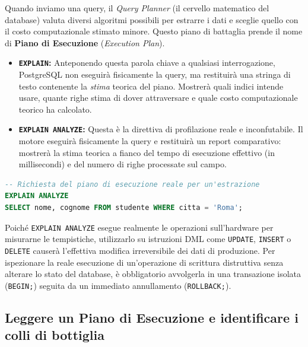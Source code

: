 Quando inviamo una query, il \textit{Query Planner} (il cervello matematico del database) valuta diversi algoritmi possibili per estrarre i dati e sceglie quello con il costo computazionale stimato minore. Questo piano di battaglia prende il nome di \textbf{Piano di Esecuzione} (\textit{Execution Plan}).

\begin{itemize}
    \item \textbf{\texttt{EXPLAIN}:} Anteponendo questa parola chiave a qualsiasi interrogazione, PostgreSQL non eseguirà fisicamente la query, ma restituirà una stringa di testo contenente la \textit{stima} teorica del piano. Mostrerà quali indici intende usare, quante righe stima di dover attraversare e quale costo computazionale teorico ha calcolato.
    \item \textbf{\texttt{EXPLAIN ANALYZE}:} Questa è la direttiva di profilazione reale e inconfutabile. Il motore eseguirà fisicamente la query e restituirà un report comparativo: mostrerà la stima teorica a fianco del tempo di esecuzione effettivo (in millisecondi) e del numero di righe processate sul campo.
\end{itemize}

\begin{lstlisting}[language=SQL, basicstyle=\ttfamily\small, keywordstyle=\color{blue}\bfseries]
-- Richiesta del piano di esecuzione reale per un'estrazione
EXPLAIN ANALYZE 
SELECT nome, cognome FROM studente WHERE citta = 'Roma';
\end{lstlisting}

\begin{warningbox}
Poiché \texttt{EXPLAIN ANALYZE} esegue realmente le operazioni sull'hardware per misurarne le tempistiche, utilizzarlo su istruzioni DML come \texttt{UPDATE}, \texttt{INSERT} o \texttt{DELETE} causerà l'effettiva modifica irreversibile dei dati di produzione. Per ispezionare la reale esecuzione di un'operazione di scrittura distruttiva senza alterare lo stato del database, è obbligatorio avvolgerla in una transazione isolata (\texttt{BEGIN;}) seguita da un immediato annullamento (\texttt{ROLLBACK;}).
\end{warningbox}

\subsection{Leggere un Piano di Esecuzione e identificare i colli di bottiglia}

